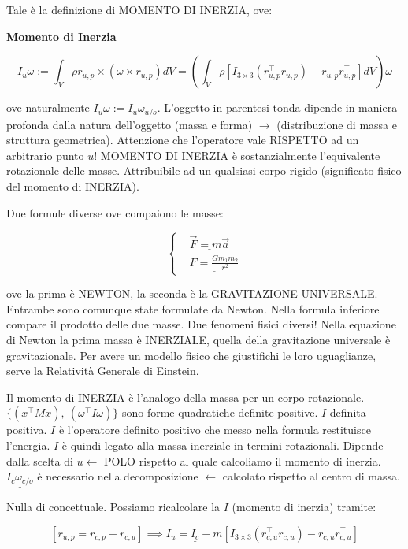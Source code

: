 Tale è la definizione di MOMENTO DI INERZIA, ove:

\begin{defn}{\textbf{Momento di Inerzia}}

\[
	I_u\omega := \int_V{\rho r_{u,p}\times (\omega\times r_{u,p})dV} = (\int_V{\rho[I_{3\times 3}(r_{u,p}^\top r_{u,p}) - r_{u,p}r_{u,p}^\top]dV})\omega
\]

\end{defn}

ove naturalmente $I_u\omega := I_u\omega_{u/o}$. L'oggetto in parentesi tonda dipende in maniera profonda dalla natura dell'oggetto (massa e forma) $\rightarrow$ (distribuzione di massa e struttura geometrica). Attenzione che l'operatore vale RISPETTO ad un arbitrario punto $u$! MOMENTO DI INERZIA è sostanzialmente l'equivalente rotazionale delle masse. Attribuibile ad un qualsiasi corpo rigido (significato fisico del momento di INERZIA).

Due formule diverse ove compaiono le masse:

\[
	\left\{
	\begin{aligned}
	&\underline{\vec{F}=m\vec{a}}\\
	&\underline{F = \frac{Gm_1m_2}{r^2}}
	\end{aligned}
	\right.
\]

ove la prima è NEWTON, la seconda è la GRAVITAZIONE UNIVERSALE. Entrambe sono comunque state formulate da Newton. Nella formula inferiore compare il prodotto delle due masse. Due fenomeni fisici diversi! Nella equazione di Newton la prima massa è INERZIALE, quella della gravitazione universale è gravitazionale. Per avere un modello fisico che giustifichi le loro uguaglianze, serve la Relatività Generale di Einstein.

Il momento di INERZIA è l'analogo della massa per un corpo rotazionale. \newline $\{(x^\top Mx),\ (\omega^\top I\omega)\}$ sono forme quadratiche definite positive. $I$ definita positiva. $I$ è l'operatore definito positivo che messo nella formula restituisce l'energia. $I$ è quindi legato alla massa inerziale in termini rotazionali. Dipende dalla scelta di $u \leftarrow$ POLO rispetto al quale calcoliamo il momento di inerzia. $\underline{I_c\omega_{c/o}}$ è necessario nella decomposizione $\leftarrow$ calcolato rispetto al centro di massa.

Nulla di concettuale. Possiamo ricalcolare la $I$ (momento di inerzia) tramite:

\[
	[r_{u,p} = r_{c,p} - r_{c,u}] \implies I_u = \underline{I_c} + m[I_{3\times 3}(r_{c,u}^\top r_{c,u}) - r_{c,u}r_{c,u}^\top]
\]

